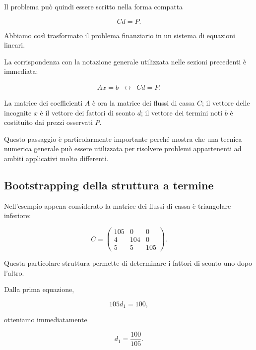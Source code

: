 Il problema può quindi essere scritto nella forma compatta

\begin{equation*}
	Cd=P.
    \label{eq:CdP}
\end{equation*}

Abbiamo così trasformato il problema finanziario in un sistema di
equazioni lineari.

La corrispondenza con la notazione generale utilizzata nelle
sezioni precedenti è immediata:

\begin{equation*}
\begin{array}{ccc}
Ax=b
&\longleftrightarrow&
Cd=P.
\end{array}
\end{equation*}

La matrice dei coefficienti $A$ è ora la matrice dei flussi di
cassa $C$; il vettore delle incognite $x$ è il vettore dei fattori
di sconto $d$; il vettore dei termini noti $b$ è costituito dai
prezzi osservati $P$.

Questo passaggio è particolarmente importante perché mostra che
una tecnica numerica generale può essere utilizzata per risolvere
problemi appartenenti ad ambiti applicativi molto differenti.

\iffalse
\subsection{Bootstrapping della struttura a termine}

Nell'esempio appena considerato la matrice dei flussi di cassa è
triangolare inferiore:

\begin{equation*}
C=
\begin{pmatrix}
105 & 0   & 0\\
4   & 104 & 0\\
5   & 5   & 105
\end{pmatrix}.
\end{equation*}

Questa particolare struttura permette di determinare i fattori di
sconto uno dopo l'altro.

Dalla prima equazione,

\begin{equation*}
    105d_1=100,
\end{equation*}

otteniamo immediatamente

\begin{equation*}
    d_1=\frac{100}{105}.
    \label{eq:d1-bootstrap}
\end{equation*}

